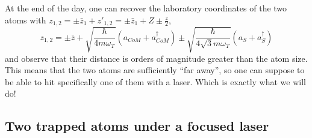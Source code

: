 At the end of the day, one can recover the laboratory coordinates of the two atoms with $z_{1,2}=\pm\bar{z}_1+z'_{1,2} = \pm \bar{z}_1 + Z \pm \frac{z}{2}$,
\begin{equation}
\label{eq:lab-coords}
z_{1,2} =
    \pm\bar{z}
    + \sqrt{\frac{\hbar}{4m\omega_T}}
        \left( a_{CoM} + a_{CoM}^\dag \right)
    \pm \sqrt{\frac{\hbar}{4\sqrt{3}m\omega_T}}
        \left( a_S + a_S^\dag \right)
\end{equation}
and observe that their distance is orders of magnitude greater than the atom size. This means that the two atoms are sufficiently ``far away'', so one can suppose to be able to hit specifically one of them with a laser. Which is exactly what we will do!



\subsection{Two trapped atoms under a focused laser}

